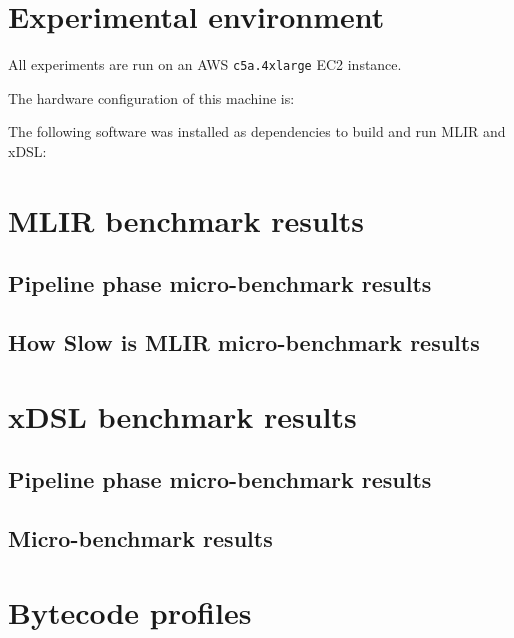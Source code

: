 \appendix

\chapter{Experimental environment}
\label{chap:experimental-environment}

All experiments are run on an AWS \texttt{c5a.4xlarge} EC2 instance.

The hardware configuration of this machine is:


The following software was installed as dependencies to build and run MLIR and xDSL:



\chapter{MLIR benchmark results}
\label{chap:mlir-benchmark-results}

\section{Pipeline phase micro-benchmark results}

\section{How Slow is MLIR micro-benchmark results}


\chapter{xDSL benchmark results}
\label{chap:mlir-benchmark-results}

\section{Pipeline phase micro-benchmark results}

\section{Micro-benchmark results}




\chapter{Bytecode profiles}
\label{chap:bytecode-profiles}

